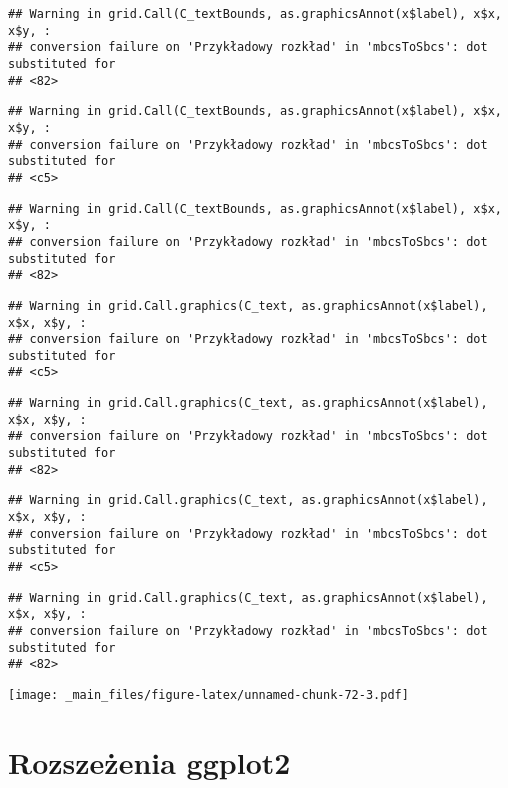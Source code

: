 \documentclass[
]{book}
\begin{document}
\begin{verbatim}
## Warning in grid.Call(C_textBounds, as.graphicsAnnot(x$label), x$x, x$y, :
## conversion failure on 'Przykładowy rozkład' in 'mbcsToSbcs': dot substituted for
## <82>
\end{verbatim}

\begin{verbatim}
## Warning in grid.Call(C_textBounds, as.graphicsAnnot(x$label), x$x, x$y, :
## conversion failure on 'Przykładowy rozkład' in 'mbcsToSbcs': dot substituted for
## <c5>
\end{verbatim}

\begin{verbatim}
## Warning in grid.Call(C_textBounds, as.graphicsAnnot(x$label), x$x, x$y, :
## conversion failure on 'Przykładowy rozkład' in 'mbcsToSbcs': dot substituted for
## <82>
\end{verbatim}

\begin{verbatim}
## Warning in grid.Call.graphics(C_text, as.graphicsAnnot(x$label), x$x, x$y, :
## conversion failure on 'Przykładowy rozkład' in 'mbcsToSbcs': dot substituted for
## <c5>
\end{verbatim}

\begin{verbatim}
## Warning in grid.Call.graphics(C_text, as.graphicsAnnot(x$label), x$x, x$y, :
## conversion failure on 'Przykładowy rozkład' in 'mbcsToSbcs': dot substituted for
## <82>
\end{verbatim}

\begin{verbatim}
## Warning in grid.Call.graphics(C_text, as.graphicsAnnot(x$label), x$x, x$y, :
## conversion failure on 'Przykładowy rozkład' in 'mbcsToSbcs': dot substituted for
## <c5>
\end{verbatim}

\begin{verbatim}
## Warning in grid.Call.graphics(C_text, as.graphicsAnnot(x$label), x$x, x$y, :
## conversion failure on 'Przykładowy rozkład' in 'mbcsToSbcs': dot substituted for
## <82>
\end{verbatim}

\texttt{[image: \_main\_files/figure-latex/unnamed-chunk-72-3.pdf]}

\hypertarget{rozszeux17cenia-ggplot2}{%
\section{Rozszeżenia ggplot2}\label{rozszeux17cenia-ggplot2}}
\end{document}
